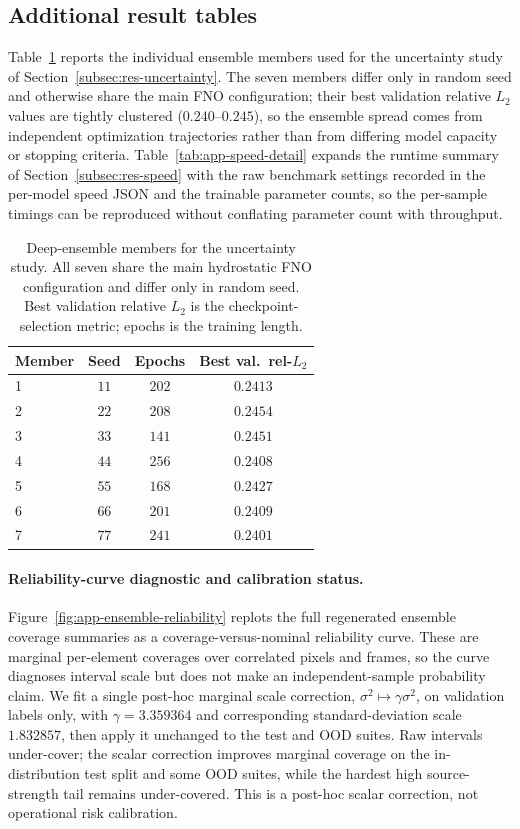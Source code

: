 \subsection{Additional result tables}
\label{app:add-result-tab}

Table~\ref{tab:app-ensemble} reports the individual ensemble members used for the uncertainty study of Section~\ref{subsec:res-uncertainty}. The seven members differ only in random seed and otherwise share the main FNO configuration; their best validation relative $L_2$ values are tightly clustered ($0.240$--$0.245$), so the ensemble spread comes from independent optimization trajectories rather than from differing model capacity or stopping criteria. Table~\ref{tab:app-speed-detail} expands the runtime summary of Section~\ref{subsec:res-speed} with the raw benchmark settings recorded in the per-model speed JSON and the trainable parameter counts, so the per-sample timings can be reproduced without conflating parameter count with throughput.

\begin{table}[H]
\centering
\caption{Deep-ensemble members for the uncertainty study. All seven share the main hydrostatic FNO configuration and differ only in random seed. Best validation relative $L_2$ is the checkpoint-selection metric; epochs is the training length.}
\label{tab:app-ensemble}
\begin{tabular}{lccc}
    \toprule
    Member & Seed & Epochs & Best val.\ rel-$L_2$ \\
    \midrule
    1 & $11$ & $202$ & $0.2413$ \\
    2 & $22$ & $208$ & $0.2454$ \\
    3 & $33$ & $141$ & $0.2451$ \\
    4 & $44$ & $256$ & $0.2408$ \\
    5 & $55$ & $168$ & $0.2427$ \\
    6 & $66$ & $201$ & $0.2409$ \\
    7 & $77$ & $241$ & $0.2401$ \\
    \bottomrule
\end{tabular}
\end{table}

\paragraph{Reliability-curve diagnostic and calibration status.}
Figure~\ref{fig:app-ensemble-reliability} replots the full regenerated ensemble coverage summaries as a coverage-versus-nominal reliability curve. These are marginal per-element coverages over correlated pixels and frames, so the curve diagnoses interval scale but does not make an independent-sample probability claim. We fit a single post-hoc marginal scale correction, $\sigma ^ 2 \mapsto \gamma \sigma ^ 2$, on validation labels only, with $\gamma = 3.359364$ and corresponding standard-deviation scale $1.832857$, then apply it unchanged to the test and OOD suites. Raw intervals under-cover; the scalar correction improves marginal coverage on the in-distribution test split and some OOD suites, while the hardest high source-strength tail remains under-covered. This is a post-hoc scalar correction, not operational risk calibration.


